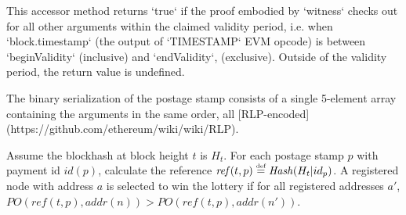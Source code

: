 This accessor method returns `true` if the proof embodied by `witness` checks out for all other arguments within the claimed 
validity period, i.e. when `block.timestamp` (the output of `TIMESTAMP` EVM opcode) is between `beginValidity` (inclusive) and 
`endValidity`, (exclusive). Outside of the validity period, the return value is undefined.

The binary serialization of the postage stamp consists of a single 5-element array containing the arguments in the same order, all [RLP-encoded](https://github.com/ethereum/wiki/wiki/RLP). 


Assume the blockhash at block height $t$ is $H_t$. For each postage stamp $p$ with payment id $\mathit{id}(p)$, calculate the reference $\mathit{ref}(t, p)\overset{\textrm{\tiny def}}{=} \mathit{Hash}(H_t|id_p)$. A registered node with address $a$ is selected to win the lottery if for all registered addresses $a'$,  $\mathit{PO}(\mathit{ref}(t, p), \mathit{addr}(n))
>\mathit{PO}(\mathit{ref}(t, p), \mathit{addr}(n'))$.